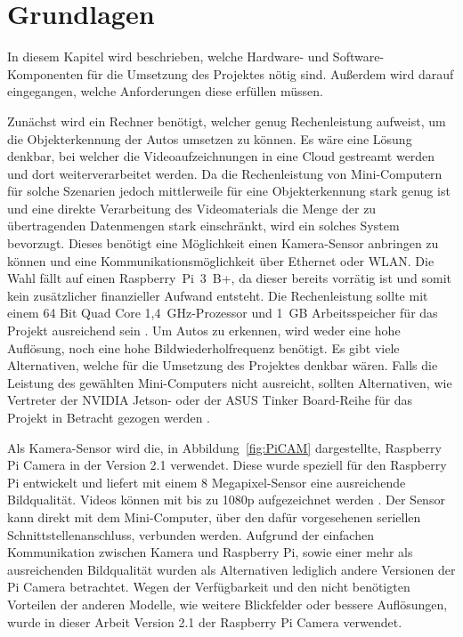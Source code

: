 \section{Grundlagen}\label{ch:Grundlagen}
In diesem Kapitel wird beschrieben, welche Hardware- und Software-Komponenten für die Umsetzung des Projektes nötig sind.
Außerdem wird darauf eingegangen, welche Anforderungen diese erfüllen müssen.

Zunächst wird ein Rechner benötigt, welcher genug Rechenleistung aufweist, um die Objekt\-erkennung der Autos umsetzen zu können.
Es wäre eine Lösung denkbar, bei welcher die Videoaufzeichnungen in eine Cloud gestreamt werden und dort weiterverarbeitet werden.
Da die Rechenleistung von Mini-Computern für solche Szenarien jedoch mittlerweile für eine Objekterkennung stark genug ist und eine direkte Verarbeitung des Videomaterials die Menge der zu übertragenden Datenmengen stark einschränkt, wird ein solches System bevorzugt.
Dieses benötigt eine Möglichkeit einen Kamera-Sensor anbringen zu können und eine Kommunikationsmöglichkeit über Ethernet oder WLAN.
Die Wahl fällt auf einen Raspberry~Pi~3~B+, da dieser bereits vorrätig ist und somit kein zusätzlicher finanzieller Aufwand entsteht.
Die Rechenleistung sollte mit einem 64 Bit Quad Core 1,4~GHz-Prozessor und 1~GB Arbeitsspeicher für das Projekt ausreichend sein \cite{pi3}.
Um Autos zu erkennen, wird weder eine hohe Auflösung, noch eine hohe Bildwiederholfrequenz benötigt.
Es gibt viele Alternativen, welche für die Umsetzung des Projektes denkbar wären.
Falls die Leistung des gewählten Mini-Computers nicht ausreicht, sollten Alternativen, wie Vertreter der NVIDIA Jetson- oder der ASUS Tinker Board-Reihe für das Projekt in Betracht gezogen werden \cite{jetson} \cite{tinkerBoard}.

Als Kamera-Sensor wird die, in Abbildung~\ref{fig:PiCAM} dargestellte, Raspberry Pi Camera in der Version 2.1 verwendet.
Diese wurde speziell für den Raspberry Pi entwickelt und liefert mit einem 8 Megapixel-Sensor eine ausreichende Bildqualität.
Videos können mit bis zu 1080p aufgezeichnet werden \cite{piCAM}.
Der Sensor kann direkt mit dem Mini-Computer, über den dafür vorgesehenen seriellen Schnittstellenanschluss, verbunden werden.
Aufgrund der einfachen Kommunikation zwischen Kamera und Raspberry Pi, sowie einer mehr als ausreichenden Bildqualität wurden als Alternativen lediglich andere Versionen der Pi Camera betrachtet.
Wegen der Verfügbarkeit und den nicht benötigten Vorteilen der anderen Modelle, wie weitere Blickfelder oder bessere Auflösungen, wurde in dieser Arbeit Version 2.1 der Raspberry Pi Camera verwendet.


